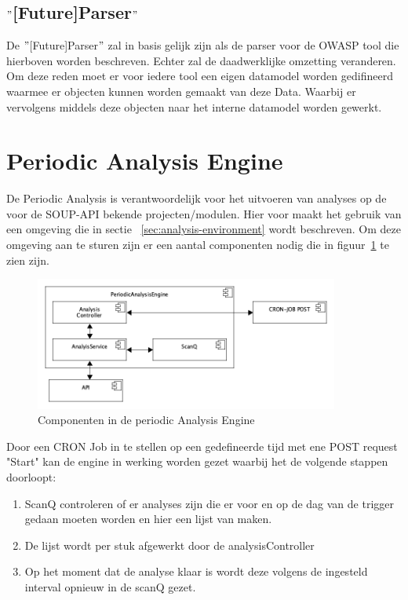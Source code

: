 \subsection{$"$[Future]Parser$"$}\label{subsec:$"$[future]parser$"$}
De $"$[Future]Parser$"$ zal in basis gelijk zijn als de parser voor de OWASP tool die hierboven worden beschreven. Echter zal de daadwerklijke omzetting veranderen. Om deze reden moet er voor iedere tool een eigen datamodel worden gedifineerd waarmee er objecten kunnen worden gemaakt van deze Data. Waarbij er vervolgens middels deze objecten naar het interne datamodel worden gewerkt.

\clearpage


\section{Periodic Analysis Engine}\label{sec:periodiek-analysis-engine}
De Periodic Analysis is verantwoordelijk voor het uitvoeren van analyses op de voor de SOUP-API bekende projecten/modulen. Hier voor maakt het gebruik van een omgeving die in sectie ~\ref{sec:analysis-environment} wordt beschreven. Om deze omgeving aan te sturen zijn er een aantal componenten nodig die in figuur~\ref{fig:paeComps} te zien zijn.
\begin{figure}[bth]
    \myfloatalign
    \includegraphics[width=10cm]{gfx/umlet/exports/PeriodicAnalyisEngineComponents}
    \caption{Componenten in de periodic Analysis Engine}
    \label{fig:paeComps}
\end{figure}

Door een CRON Job in te stellen op een gedefineerde tijd met ene POST request "Start" kan de engine in werking worden gezet waarbij het de volgende stappen doorloopt:
\begin{enumerate}
    \item ScanQ controleren of er analyses zijn die er voor en op de dag van de trigger gedaan moeten worden en hier een lijst van maken.
    \item De lijst wordt per stuk afgewerkt door de analysisController
    \item Op het moment dat de analyse klaar is wordt deze volgens de ingesteld interval opnieuw in de scanQ gezet.
\end{enumerate}

